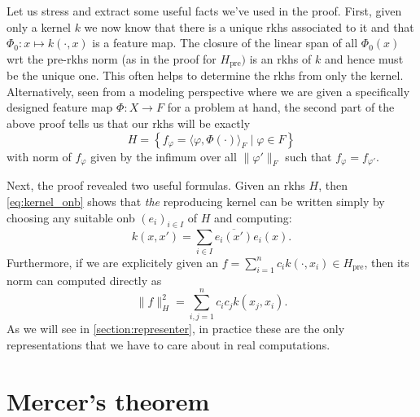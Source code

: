 
Let us stress and extract some useful facts we've used in the proof.
First, given only a kernel $k$ we now know that there is a unique rkhs
associated to it and that $\Phi_0 \colon x \mapsto k(\cdot,x)$ is a 
feature map.
The closure of the linear span of all $\Phi_0(x)$ wrt the 
pre-rkhs norm (as in the proof for $H_{\textrm{pre}})$ is 
an rkhs of $k$ and hence must be the unique one.
This often helps to determine the rkhs from only the kernel.
Alternatively, seen from a modeling perspective where
we are given a specifically designed feature 
map $\Phi \colon X \to F$ for a problem at hand, 
the second part of the above proof tells us that our
rkhs will be exactly
\begin{equation*}
    H = \left\{ f_\varphi = \langle \varphi,\Phi(\cdot) \rangle_F 
    \mid \varphi \in F \right\}
\end{equation*}
with norm of $f_\varphi$ given by the infimum over all $\|\varphi'\|_F$
such that $f_\varphi = f_{\varphi'}$.

Next, the proof revealed two useful formulas.
Given an rkhs $H$, then \cref{eq:kernel_onb} shows that \emph{the} 
reproducing kernel can be written simply by choosing any suitable onb 
$(e_i)_{i \in I}$ of $H$ and computing:
\begin{equation*}
    k(x,x') = \sum_{i \in I} \overline{e_i(x')} e_i(x).
\end{equation*}
Furthermore, if we are explicitely given an 
$f = \sum_{i=1}^n c_i k(\cdot,x_i) \in H_{\textrm{pre}}$,
then its norm can computed directly as 
\begin{equation*}
    \| f \|^2_H = \sum_{i,j = 1}^n c_i c_j k(x_j,x_i).
\end{equation*}
As we will see in \cref{section:representer}, 
in practice these are the only representations that we have to care 
about in real computations.

\section{Mercer's theorem}

